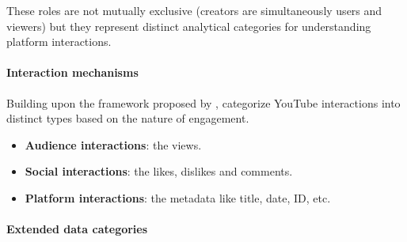 These roles are not mutually exclusive (creators are simultaneously users and viewers) but they represent distinct analytical categories for understanding platform interactions.

\paragraph{Interaction mechanisms}

Building upon the framework proposed by \textcite{giglietto2012open}, \textcite{sui2022youtube} categorize YouTube interactions into distinct types based on the nature of engagement.

\begin{itemize}
	\item \textbf{Audience interactions}: the views.

	\item \textbf{Social interactions}: the likes, dislikes and comments.

	\item \textbf{Platform interactions}: the metadata like title, date, ID, etc.
\end{itemize}

\paragraph{Extended data categories}

